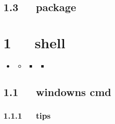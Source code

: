 \documentclass[letterpaper,12pt,english]{sphinxmanual}
\begin{document}
\section{1.3   package}
\label{\detokenize{001software/001install/python:package}}

\chapter{1   shell}
\label{\detokenize{001software/001install/shell:shell}}\label{\detokenize{001software/001install/shell::doc}}
\begin{sphinxShadowBox}
\begin{itemize}
\item {} 
\label{\detokenize{001software/001install/shell:id1}}{\hyperref[\detokenize{001software/001install/shell:shell}]{}}
\begin{itemize}
\item {} 
\label{\detokenize{001software/001install/shell:id2}}{\hyperref[\detokenize{001software/001install/shell:windowns-cmd}]{}}
\begin{itemize}
\item {} 
\label{\detokenize{001software/001install/shell:id3}}{\hyperref[\detokenize{001software/001install/shell:tips}]{}}
\begin{itemize}
\item {} 
\label{\detokenize{001software/001install/shell:id4}}{\hyperref[\detokenize{001software/001install/shell:cmd}]{}}

\end{itemize}

\end{itemize}

\end{itemize}

\end{itemize}
\end{sphinxShadowBox}


\section{1.1   windowns cmd}
\label{\detokenize{001software/001install/shell:windowns-cmd}}

\subsection{1.1.1   tips}
\label{\detokenize{001software/001install/shell:tips}}
\end{document}
